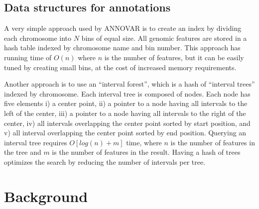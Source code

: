 \subsection{Data structures for annotations}

A very simple approach used by ANNOVAR \cite{wang2010annovar} is to create an index by dividing each chromosome into $N$ bins of equal size. All genomic features are stored in a hash table indexed by chromosome name and bin number. This approach has running time of $O(n)$ where $n$ is the number of features, but it can be easily tuned by creating small bins, at the cost of increased memory requirements.

Another approach \cite{cingolani2012program} is to use an ``interval forest'', which is a hash of ``interval trees'' indexed by chromosome. Each interval tree is composed of nodes. Each node has five elements i) a center point, ii) a pointer to a node having all intervals to the left of the center, iii) a pointer to a node having all intervals to the right of the center, iv) all intervals overlapping the center point sorted by start position, and v) all interval overlapping the center point sorted by end position. Querying an interval tree requires $O[log(n) + m]$ time, where $n$ is the number of features in the tree and $m$ is the number of features in the result. Having a hash of trees optimizes the search by reducing the number of intervals per tree.


\section{Background}

